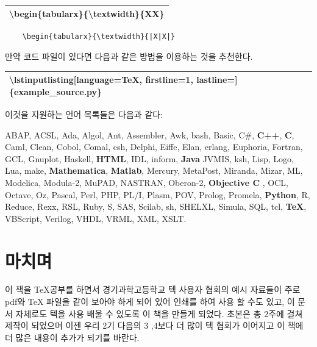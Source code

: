 \documentclass[12pt]{article}
\begin{document}
	\begin{tabularx}{\textwidth\onehalfspacing}{|X|}
		\hline
		\textbackslash begin\{tabularx\}\{\textbackslash textwidth\}\{\textbar X\textbar X\textbar\}\\
		\hline
	\end{tabularx}
	\begin{lstlisting}
	\begin{tabularx}{\textwidth}{|X|X|}
	\end{lstlisting}
	\clearpage
	만약 코드 파일이 있다면 다음과 같은 방법을 이용하는 것을 추천한다.\newline
	
	\begin{tabularx}{\textwidth\onehalfspacing}{|X|}
		\hline
		\textbackslash lstinputlisting[language=TeX, firstline=1, lastline=]\{example\_source.py\}\\
		\hline
	\end{tabularx}\newline\newline
	이것을 지원하는 언어 목록들은 다음과 같다:
	
	ABAP, ACSL, Ada, Algol, Ant, Assembler, Awk, bash, Basic, C#, \textbf{C++}, \textbf{C}, Caml, Clean, Cobol, Comal, csh, Delphi, Eiffe, Elan, erlang, Euphoria, Fortran, GCL, Gnuplot, Haskell, \textbf{HTML}, IDL, inform, \textbf{Java} JVMIS, ksh, Lisp, Logo, Lua, make, \textbf{Mathematica}, \textbf{Matlab}, Mercury, MetaPost, Miranda, Mizar, ML, Modelica, Modula-2, MuPAD, NASTRAN, Oberon-2, \textbf{Objective C} , OCL, Octave, Oz, Pascal, Perl, PHP, PL/I, Plasm, POV, Prolog, Promela, \textbf{Python}, R, Reduce, Rexx, RSL, Ruby, S, SAS, Scilab, sh, SHELXL, Simula, SQL, tcl, \textbf{TeX}, VBScript, Verilog, VHDL, VRML, XML, XSLT.
	\section{마치며}
	이 책을 \TeX 공부를 하면서 경기과학고등학교 텍 사용자 협회의 예시 자료들이 주로 pdf와 TeX 파일을 같이 보아야 하게 되어 있어 인쇄를 하여 사용 할 수도 있고, 이 문서 자체로도 텍을 사용 배울 수 있도록 이 책을 만들게 되었다. 초본은 총 2주에 걸쳐 제작이 되었으며 이젠 우리 2기 다음의 3 ,4보다 더 많이 텍 협회가 이어지고 이 책에 더 많은 내용이 추가가 되기를 바란다.
\end{document}
